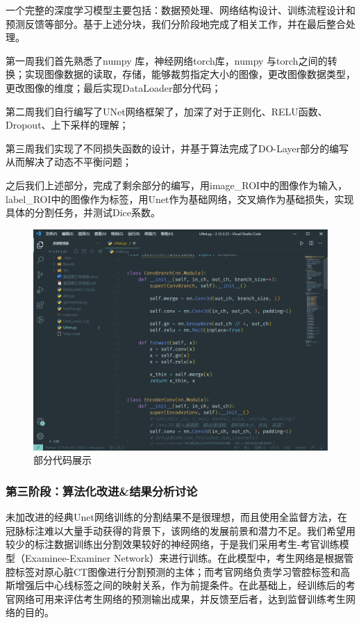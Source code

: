 \documentclass[lang=cn,11pt,a4paper,cite=numbers]{elegantpaper}
\begin{document}
一个完整的深度学习模型主要包括：数据预处理、网络结构设计、训练流程设计和预测反馈等部分。基于上述分块，我们分阶段地完成了相关工作，并在最后整合处理。

第一周我们首先熟悉了numpy 库，神经网络torch库，numpy 与torch之间的转换；实现图像数据的读取，存储，能够裁剪指定大小的图像，更改图像数据类型，更改图像的维度；最后实现DataLoader部分代码；

第二周我们自行编写了UNet网络框架了，加深了对于正则化、RELU函数、Dropout、上下采样的理解；

第三周我们实现了不同损失函数的设计，并基于算法完成了DO-Layer部分的编写从而解决了动态不平衡问题；

之后我们上述部分，完成了剩余部分的编写，用image\_ROI中的图像作为输入，label\_ROI中的图像作为标签，用Unet作为基础网络，交叉熵作为基础损失，实现具体的分割任务，并测试Dice系数。

\begin{figure}[H]
    \centering
    \includegraphics[scale=0.15]{./image/前期总结/Code.png}
    \caption{部分代码展示}
    \label{fig:Code}
\end{figure}

\subsubsection{第三阶段：算法化改进\&结果分析讨论}

未加改进的经典Unet网络训练的分割结果不是很理想，而且使用全监督方法，在冠脉标注难以大量手动获得的背景下，该网络的发展前景和潜力不足。我们希望用较少的标注数据训练出分割效果较好的神经网络，于是我们采用考生-考官训练模型（Examinee-Examiner Network）来进行训练。在此模型中，考生网络是根据管腔标签对原心脏CT图像进行分割预测的主体；而考官网络负责学习管腔标签和高斯增强后中心线标签之间的映射关系，作为前提条件。在此基础上，经训练后的考官网络可用来评估考生网络的预测输出成果，并反馈至后者，达到监督训练考生网络的目的。
\end{document}
